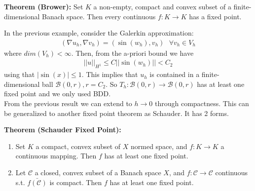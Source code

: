 \textbf{Theorem (Brower):} Set $K$ a non-empty, compact and convex subset of a finite-dimensional Banach space. Then every continuous $f:K\to K$ has a fixed point.

In the previous example, consider the Galerkin approximation:
\begin{align*}
    (\nabla u_h,\nabla v_h)=(\sin(w_h),v_h) \text{   } \forall v_h \in V_h
\end{align*}
where $dim(V_h)<\infty$. Then, from the a-priori bound we have 
\begin{align*}
    ||u||_{H^1}\leq C||\sin (w_h)||< C_2
\end{align*}
using that $|\sin (x)|\leq 1$. This implies that $u_h$ is contained in a finite-dimensional ball $\mathcal{B}(0,r), r=C_2$. So $T_h:\mathcal{B}(0,r)\to \mathcal{B}(0,r)$ has at least one fixed point and we only used BDD.\\

From the previous result we can extend to $h\to 0$ through compactness. This can be generalized to another fixed point theorem as Schauder. It has 2 forms.

\textbf{Theorem (Schauder Fixed Point):}
\begin{enumerate}[label = \alph*]
    \item Set $K$ a compact, convex subset of $X$ normed space, and $f:K\to K$ a continuous mapping. Then $f$ has at least one fixed point.
    \item Let $\mathcal{C}$ a closed, convex subset of a Banach space $X$, and $f:\mathcal{C}\to \mathcal{C}$ continuous s.t. $\bar{f(\mathcal{C})}$ is compact. Then $f$ has at least one fixed point.
\end{enumerate}

